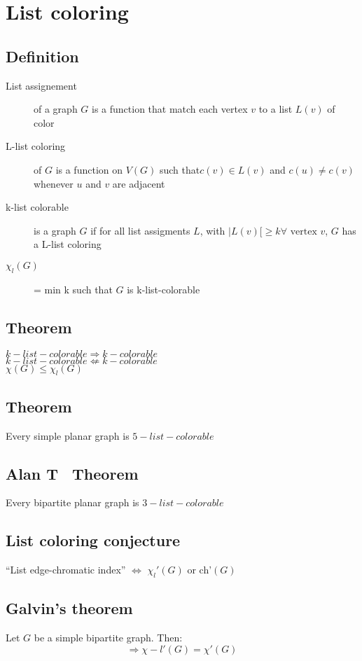     \section{List coloring}
        \subsection{Definition}
            \begin{description}
                \item[List assignement] of a graph $G$ is a function that match each vertex $v$ to a list $L(v)$ of color
                \item[L-list coloring] of $G$ is a function on $V(G)$ such that$c(v)\in L(v)$ and $c(u)\neq c(v)$ whenever $u$ and $v$ are adjacent
                \item[k-list colorable] is a graph $G$ if for all list assigments $L$, with $|L(v)[\geq k \forall \text{ vertex }v$, $G$ has a L-list coloring
                \item[$\chi_l(G)$] = min k such that $G$ is k-list-colorable
            \end{description}
        \subsection{Theorem}
                $k-list-colorable \Rightarrow k-colorable$\\
                $k-list-colorable \not\Leftarrow k-colorable$\\
                $\chi(G)\leq\chi_l(G)$
        \subsection{Theorem}
            Every simple planar graph is $5-list-colorable$
        \subsection{Alan T~ Theorem}
            Every bipartite planar graph is $3-list-colorable$
        \subsection{List coloring conjecture}
            ``List edge-chromatic index'' $\Leftrightarrow$ $\chi_l'(G)$ or ch'$(G)$
        \subsection{Galvin's theorem}
            Let $G$ be a simple bipartite graph. Then:
            \[
                \Rightarrow \chi-l'(G)=\chi'(G)
            \]
